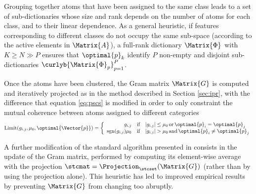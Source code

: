 \documentclass{article}
\def \nDim{N} 			%
\def \Dic{\Matrix{\Phi}} %
\def \nAto{K} 			%
\def \iAto{k} 			%
\def \Coeff{\Matrix{A}} 	%
\def \coherence{\mu} 		%
\def \iCat{p}  		%
\def \nCat{P} 		%
\def \Gram{\Matrix{G}} 						%
\def \gram{g} 								%
\begin{document}
Grouping together atoms that have been assigned to the same class leads to a set of sub-dictionaries whose size and rank depends on the number of atoms for each class, and to their linear dependence. As a general heuristic, if  features corresponding to different classes do not occupy the same sub-space (according to the active elements in $\Coeff$), a full-rank dictionary $\Dic$ with $\nAto \geq \nDim \gg \nCat$ ensures that $\optimal{\iCat}_{\iAto}$ identify $\nCat$ non-empty and disjoint sub-dictionaries $\curlyb{\Dic_{\iCat}}_{\iCat=1}^{\nCat}$.

Once the atoms have been clustered, the Gram matrix $\Gram$ is computed and iteratively projected as in the method described in Section \ref{sec:ipr}, with the difference that equation \eqref{eq:pscs} is modified in order to only constraint the mutual coherence between atoms assigned to different categories
\small
\begin{equation}\label{eq:pscs2}
\operatorname{Limit}({\gram}_{i,j},\coherence_{0},\optimal{\Vector{\iCat}}) = \left\{ \begin{array}{rl}
	\gram_{i,j}  & \text{if} \quad |\gram_{i,j}|\leq \coherence_{0} \, \text{or} \, \optimal{\iCat}_{i}=\optimal{\iCat}_{j} \\
	\operatorname{sgn}(\gram_{i,j}) \coherence_{0}  & \text{if} \quad |\gram_{i,j}|   >  \coherence_{0} \, \text{and} \, \optimal{\iCat}_{i}\neq\optimal{\iCat}_{j}
\end{array} \right.
\end{equation}
\normalsize


A further modification of the standard  algorithm presented in \cite{Barchiesi2013Le} consists in the update of the Gram matrix, performed by computing its element-wise average with the projection $\stcmat = \Projection_{\stcset}(\Gram)$ (rather than by using the projection alone). This heuristic has led to improved empirical results by preventing $\Gram$ from changing too abruptly. 
\end{document}

